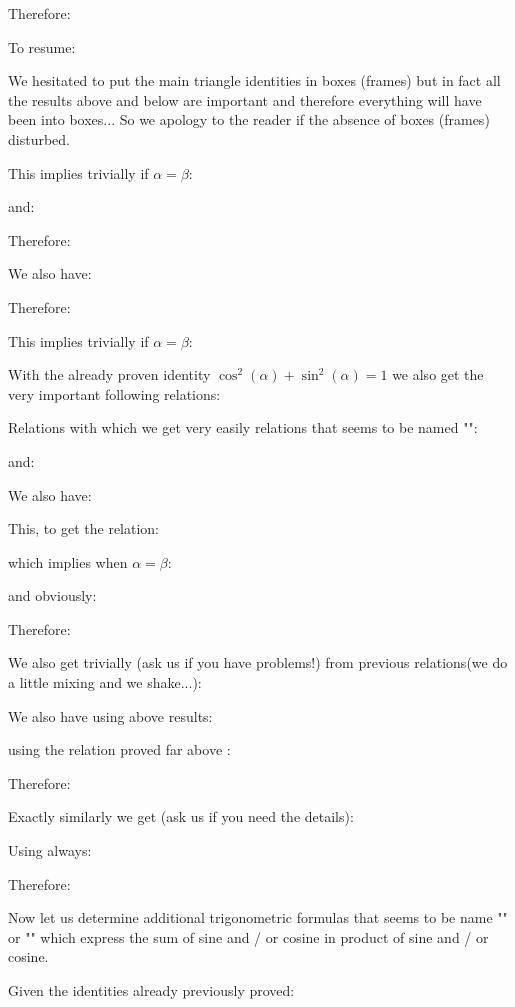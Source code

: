 	Therefore:
	
	To resume:
	
	\begin{tcolorbox}[title=Remark,colframe=black,arc=10pt]
	We hesitated to put the main triangle identities in boxes (frames) but in fact all the results above and below are important and therefore everything will have been into boxes... So we apology to the reader if the absence of boxes (frames) disturbed.
	\end{tcolorbox}
	This implies trivially if $\alpha=\beta$:
	
	and:
	
	Therefore:
	
	We also have:
	
	Therefore:
	
	This implies trivially if $\alpha=\beta$:
	
	With the already proven identity $\cos^2(\alpha)+\sin^2(\alpha)=1$ we also get the very important following relations:
	
	Relations with which we get very easily relations that seems to be named "":
	
	and: 
	
	We also have:
	
	This, to get the relation:
	
	which implies when $\alpha=\beta$:
	
	and obviously:
	
	Therefore:
	
	We also get trivially (ask us if you have problems!) from previous relations(we do a little mixing and we shake...):
	
	We also have using above results:
	
	using the relation proved far above :
	
	Therefore:
	
	Exactly similarly we get (ask us if you need the details):
	
	Using always:
	
	Therefore:
	
	Now let us determine additional trigonometric formulas that seems to be name "" or "" which express the sum of sine and / or cosine in product of sine and / or cosine.
	
	Given the identities already previously proved:
	
